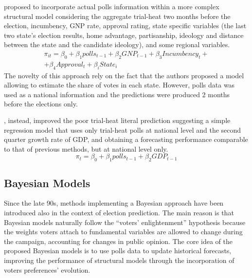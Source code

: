 \documentclass[
  12pt]{article}
\begin{document}
\citet{gel:kin:1993} proposed to incorporate actual polls information
within a more complex structural model considering the aggregate
trial-heat two months before the election, incumbency, GNP rate,
approval rating, state specific variables (the last two state's election
results, home advantage, partisanship, ideology and distance between the
state and the candidate ideology), and some regional variables. \[
\begin{aligned}
\pi_{it} = \beta_0 + \beta_1 polls_{t-1} + \beta_2 GNP_{t-1} + \beta_3 Incumbency_t + \\
+ \beta_4 Approval_t + \beta_i State_i \;\;\;\;\;\;\;\;\;\;\;\;\;\;\;\;\;\;\;\;\;\;\;\;\;\;\;\;\;\;\;\;\;\;\;\;\;
\end{aligned}
\] The novelty of this approach rely on the fact that the authors
proposed a model allowing to estimate the share of votes in each state.
However, polls data was used as a national information and the
predictions were produced 2 months before the elections only.

\citet{cam:1996}, instead, improved the poor trial-heat literal
prediction suggesting a simple regression model that uses only
trial-heat polls at national level and the second quarter growth rate of
GDP, and obtaining a forecasting performance comparable to that of
previous methods, but at national level only.
\[\pi_t = \beta_0 + \beta_1 polls_{t-1} + \beta_2 GDP_{t-1}\]

\hypertarget{bayesian-models}{%
\subsection{Bayesian Models}\label{bayesian-models}}

Since the late 90s, methods implementing a Bayesian approach have been
introduced also in the context of election prediction. The main reason
is that Bayesian models naturally follow the ``voters' enlightenment''
hypothesis because the weights voters attach to fundamental variables
are allowed to change during the campaign, accounting for changes in
public opinion. The core idea of the proposed Bayesian models is to use
polls data to update historical forecasts, improving the performance of
structural models through the incorporation of voters preferences'
evolution.
\end{document}
